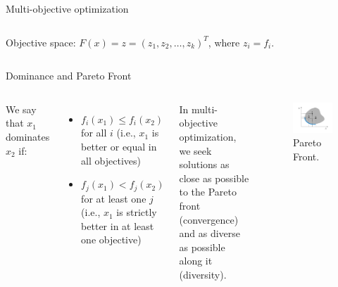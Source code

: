 \documentclass[aspectratio=169,xcolor=dvipsnames]{beamer}
\begin{document}
\begin{frame}{Multi-objective optimization}
\begin{columns}[c]
        Objective space: $F(x) = z = (z_1, z_2,\dots,z_k)^T$, where $z_i = f_i$.

    \end{columns}
\end{frame}


\begin{frame}{Dominance and Pareto Front}
    \begin{columns}[c]
        We say that $x_1$ dominates $x_2$ if:
        \begin{itemize}
            \item $f_i(x_1) \leq f_i(x_2)$ for all $i$ (i.e., $x_1$ is better or equal in all objectives)
            \item $f_j(x_1) < f_j(x_2)$ for at least one $j$ (i.e., $x_1$ is strictly better in at least one objective)
        \end{itemize}
        \vspace{1em}
        In multi-objective optimization, we seek solutions as close as possible to the Pareto front (\alert{convergence}) and as diverse as possible along it (\alert{diversity}).

        \begin{figure}
            \centering
            \includegraphics[width=1.0\linewidth]{imgs/pareto-front.pdf}
            \caption{Pareto Front.}
        \end{figure}
    \end{columns}
\end{frame}
\end{document}
